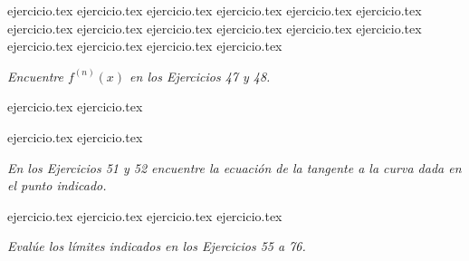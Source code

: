 \begin{enumerate}
    \setcounter{enumi}{16}
    {ejercicio.tex}
{ejercicio.tex}
{ejercicio.tex}
{ejercicio.tex}
{ejercicio.tex}
{ejercicio.tex}
{ejercicio.tex}
{ejercicio.tex}
{ejercicio.tex}
{ejercicio.tex}
{ejercicio.tex}
{ejercicio.tex}
{ejercicio.tex}
{ejercicio.tex}
{ejercicio.tex}
{ejercicio.tex}
\end{enumerate}

\vspace{1em}
\noindent \textit{Encuentre $f^{(n)}(x)$ en los Ejercicios 47 y 48.}

\begin{enumerate}
    \setcounter{enumi}{46}
    {ejercicio.tex}
{ejercicio.tex}
\end{enumerate}

\begin{enumerate}
    \setcounter{enumi}{48}
    {ejercicio.tex}
{ejercicio.tex}
\end{enumerate}

\vspace{1em}
\noindent \textit{En los Ejercicios 51 y 52 encuentre la ecuación de la tangente a la curva dada en el punto indicado.}

\begin{enumerate}
    \setcounter{enumi}{50}
    {ejercicio.tex}
{ejercicio.tex}
{ejercicio.tex}
{ejercicio.tex}
\end{enumerate}

\vspace{1em}
\noindent \textit{Evalúe los límites indicados en los Ejercicios 55 a 76.}

